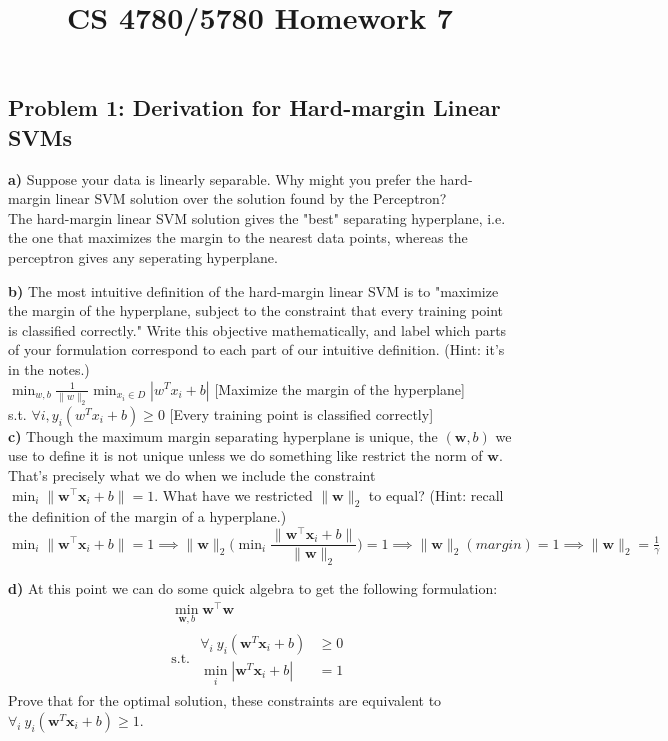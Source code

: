 \documentclass[a4paper]{article}
\title{CS 4780/5780 Homework 7\vspace{-10pt}}
\date{\vspace{-0pt}}
\begin{document}
\maketitle

\subsection*{Problem 1: Derivation for Hard-margin Linear SVMs}
\textbf{a)} Suppose your data is linearly separable. Why might you prefer the hard-margin linear SVM solution over the solution found by the Perceptron?\\

The hard-margin linear SVM solution gives the "best" separating hyperplane, i.e. the one that maximizes the margin to the nearest data points, whereas the perceptron gives any seperating hyperplane.

\textbf{b)} The most intuitive definition of the hard-margin linear SVM is to "maximize the margin of the hyperplane, subject to the constraint that every training point is classified correctly." Write this objective mathematically, and label which parts of your formulation correspond to each part of our intuitive definition. (Hint: it's in the notes.)\\

$\min_{w,b}\frac{1}{\lVert w \rVert_2} \min_{x_i \in D} |w^Tx_i + b|$ [Maximize the margin of the hyperplane]\\
s.t. $\forall i, y_i(w^Tx_i + b) \geq 0$ [Every training point is classified correctly]\\

\textbf{c)} Though the maximum margin separating hyperplane is unique, the $(\mathbf{w},b)$ we use to define it is not unique unless we do something like restrict the norm of $\mathbf{w}$. That's precisely what we do when we include the constraint $\min_i\|\mathbf{w}^\top\mathbf{x}_i+b\|=1$. What have we restricted $\|\mathbf{w}\|_2$ to equal? (Hint: recall the definition of the margin of a hyperplane.)\\

$\min_i\|\mathbf{w}^\top\mathbf{x}_i+b\|=1 \implies \lVert \mathbf{w} \rVert_2\Bigg(\min_i\dfrac{\|\mathbf{w}^\top\mathbf{x}_i+b\|}{\lVert \mathbf{w} \rVert_2}\Bigg)=1 \implies \lVert \mathbf{w} \rVert_2(margin)=1 \implies \boxed{\lVert \mathbf{w} \rVert_2 = \frac{1}{\gamma}}$

\textbf{d)} At this point we can do some quick algebra to get the following formulation:
\begin{align*} &\min_{\mathbf{w},b} \mathbf{w}^\top\mathbf{w} & \\ &\textrm{s.t. } \begin{matrix} \forall_i \ y_{i}(\mathbf{w}^T \mathbf{x}_{i}+b)&\geq 0\\ \min_{i}\left | \mathbf{w}^T \mathbf{x}_{i}+b \right | &= 1 \end{matrix} \end{align*}
Prove that for the optimal solution, these constraints are equivalent to $ \forall_i \ y_{i}(\mathbf{w}^T \mathbf{x}_{i}+b) \geq 1 $.\\
\end{document}
